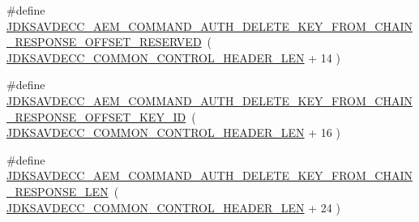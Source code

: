 \begin{DoxyCompactItemize}
\item 
\#define \hyperlink{group__command__auth__delete__key__from__chain__response_ga452e9000e0741c143add012609145b62}{J\+D\+K\+S\+A\+V\+D\+E\+C\+C\+\_\+\+A\+E\+M\+\_\+\+C\+O\+M\+M\+A\+N\+D\+\_\+\+A\+U\+T\+H\+\_\+\+D\+E\+L\+E\+T\+E\+\_\+\+K\+E\+Y\+\_\+\+F\+R\+O\+M\+\_\+\+C\+H\+A\+I\+N\+\_\+\+R\+E\+S\+P\+O\+N\+S\+E\+\_\+\+O\+F\+F\+S\+E\+T\+\_\+\+R\+E\+S\+E\+R\+V\+ED}~( \hyperlink{group__jdksavdecc__avtp__common__control__header_gaae84052886fb1bb42f3bc5f85b741dff}{J\+D\+K\+S\+A\+V\+D\+E\+C\+C\+\_\+\+C\+O\+M\+M\+O\+N\+\_\+\+C\+O\+N\+T\+R\+O\+L\+\_\+\+H\+E\+A\+D\+E\+R\+\_\+\+L\+EN} + 14 )
\item 
\#define \hyperlink{group__command__auth__delete__key__from__chain__response_ga2911d1ebcae1d04d524ecf8e568109a2}{J\+D\+K\+S\+A\+V\+D\+E\+C\+C\+\_\+\+A\+E\+M\+\_\+\+C\+O\+M\+M\+A\+N\+D\+\_\+\+A\+U\+T\+H\+\_\+\+D\+E\+L\+E\+T\+E\+\_\+\+K\+E\+Y\+\_\+\+F\+R\+O\+M\+\_\+\+C\+H\+A\+I\+N\+\_\+\+R\+E\+S\+P\+O\+N\+S\+E\+\_\+\+O\+F\+F\+S\+E\+T\+\_\+\+K\+E\+Y\+\_\+\+ID}~( \hyperlink{group__jdksavdecc__avtp__common__control__header_gaae84052886fb1bb42f3bc5f85b741dff}{J\+D\+K\+S\+A\+V\+D\+E\+C\+C\+\_\+\+C\+O\+M\+M\+O\+N\+\_\+\+C\+O\+N\+T\+R\+O\+L\+\_\+\+H\+E\+A\+D\+E\+R\+\_\+\+L\+EN} + 16 )
\item 
\#define \hyperlink{group__command__auth__delete__key__from__chain__response_ga318d8a52d9e3502557122ceced9277fd}{J\+D\+K\+S\+A\+V\+D\+E\+C\+C\+\_\+\+A\+E\+M\+\_\+\+C\+O\+M\+M\+A\+N\+D\+\_\+\+A\+U\+T\+H\+\_\+\+D\+E\+L\+E\+T\+E\+\_\+\+K\+E\+Y\+\_\+\+F\+R\+O\+M\+\_\+\+C\+H\+A\+I\+N\+\_\+\+R\+E\+S\+P\+O\+N\+S\+E\+\_\+\+L\+EN}~( \hyperlink{group__jdksavdecc__avtp__common__control__header_gaae84052886fb1bb42f3bc5f85b741dff}{J\+D\+K\+S\+A\+V\+D\+E\+C\+C\+\_\+\+C\+O\+M\+M\+O\+N\+\_\+\+C\+O\+N\+T\+R\+O\+L\+\_\+\+H\+E\+A\+D\+E\+R\+\_\+\+L\+EN} + 24 )
\end{DoxyCompactItemize}

